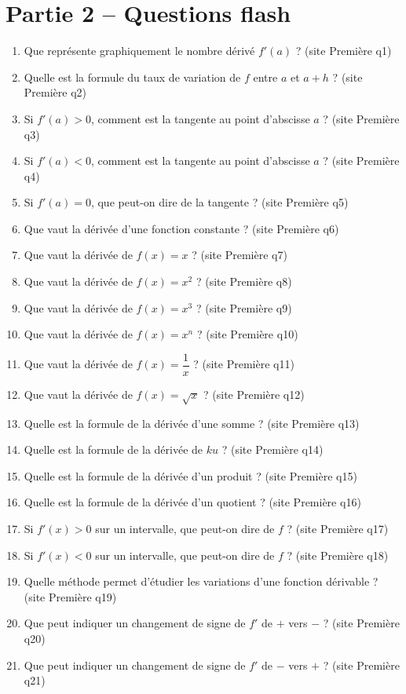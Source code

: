 \documentclass[11pt,a4paper]{article}
\newcommand{\sourceq}[1]{ {\scriptsize\textcolor{bleufonce}{(site Première q#1)}}}
\newcounter{question}
\newenvironment{blocquestions}[1]{%
  \begin{tcolorbox}[enhanced,breakable,colback=bleuclair,colframe=bleufonce,boxrule=0.6pt,arc=2mm,left=2mm,right=2mm,top=2mm,bottom=1.5mm,title={\bfseries #1},coltitle=white,colbacktitle=bleufonce,before skip=3mm,after skip=3mm, fontupper=\large]
  \large
  \begin{enumerate}[leftmargin=*,label=\textbf{\arabic*.},itemsep=0.82em,topsep=0.5em]
  \setcounter{enumi}{\value{question}}
}{%
  \setcounter{question}{\value{enumi}}
  \end{enumerate}
  \end{tcolorbox}
}
\begin{document}
\section*{Partie 2 -- Questions flash}
\begin{blocquestions}{Questions flash -- Dérivation}
  \item Que représente graphiquement le nombre dérivé $f'(a)$ ? \sourceq{1}
  \item Quelle est la formule du taux de variation de $f$ entre $a$ et $a+h$ ? \sourceq{2}
  \item Si $f'(a)>0$, comment est la tangente au point d'abscisse $a$ ? \sourceq{3}
  \item Si $f'(a)<0$, comment est la tangente au point d'abscisse $a$ ? \sourceq{4}
  \item Si $f'(a)=0$, que peut-on dire de la tangente ? \sourceq{5}
  \item Que vaut la dérivée d'une fonction constante ? \sourceq{6}
  \item Que vaut la dérivée de $f(x)=x$ ? \sourceq{7}
  \item Que vaut la dérivée de $f(x)=x^2$ ? \sourceq{8}
  \item Que vaut la dérivée de $f(x)=x^3$ ? \sourceq{9}
  \item Que vaut la dérivée de $f(x)=x^n$ ? \sourceq{10}
  \item Que vaut la dérivée de $f(x)=\dfrac1x$ ? \sourceq{11}
  \item Que vaut la dérivée de $f(x)=\sqrt{x}$ ? \sourceq{12}
  \item Quelle est la formule de la dérivée d'une somme ? \sourceq{13}
  \item Quelle est la formule de la dérivée de $ku$ ? \sourceq{14}
  \item Quelle est la formule de la dérivée d'un produit ? \sourceq{15}
  \item Quelle est la formule de la dérivée d'un quotient ? \sourceq{16}
  \item Si $f'(x)>0$ sur un intervalle, que peut-on dire de $f$ ? \sourceq{17}
  \item Si $f'(x)<0$ sur un intervalle, que peut-on dire de $f$ ? \sourceq{18}
  \item Quelle méthode permet d'étudier les variations d'une fonction dérivable ? \sourceq{19}
  \item Que peut indiquer un changement de signe de $f'$ de $+$ vers $-$ ? \sourceq{20}
  \item Que peut indiquer un changement de signe de $f'$ de $-$ vers $+$ ? \sourceq{21}

\end{blocquestions}
\end{document}
